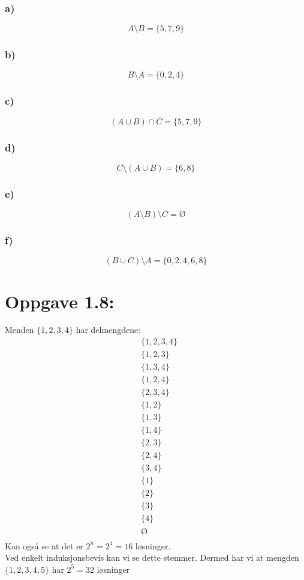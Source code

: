 \documentclass[a4paper, norsk, 10pt]{article}
\begin{document}
\begin{flushleft}
\subsubsection*{a)} \[A\setminus B = \{5,7,9\}\]
\subsubsection*{b)} \[B \setminus A = \{0,2,4\}\]
\subsubsection*{c)} \[(A\cup B) \cap C = \{5,7,9\}\]
\subsubsection*{d)} \[C \setminus (A \cup B) = \{6,8\}\]
\subsubsection*{e)} \[(A\setminus B)\setminus C = Ø\]
\subsubsection*{f)} \[(B \cup C) \setminus A = \{0,2,4,6,8\}\]

\section*{Oppgave 1.8:}
Menden \(\{1,2,3,4\}\) har delmengdene:
\[\begin{split}
  &\{1,2,3,4\}\\
&\{1,2,3\}\\
&\{1,3,4\}\\
&\{1,2,4\}\\
&\{2,3,4\}\\
&\{1,2\}\\
&\{1,3\}\\
&\{1,4\}\\
&\{2,3\}\\
&\{2,4\}\\
&\{3,4\}\\
&\{1\}\\
&\{2\}\\
&\{3\}\\
&\{4\}\\
&Ø\\
\end{split}\]
Kan også se at det er \(2^{n} = 2^{4} = 16\) løsninger. \\Ved enkelt induksjonsbevis kan vi se dette stemmer. Dermed har vi at mengden \(\{1,2,3,4,5\}\) har \( 2^{5} = 32 \) løsninger
\end{flushleft}
\end{document}
